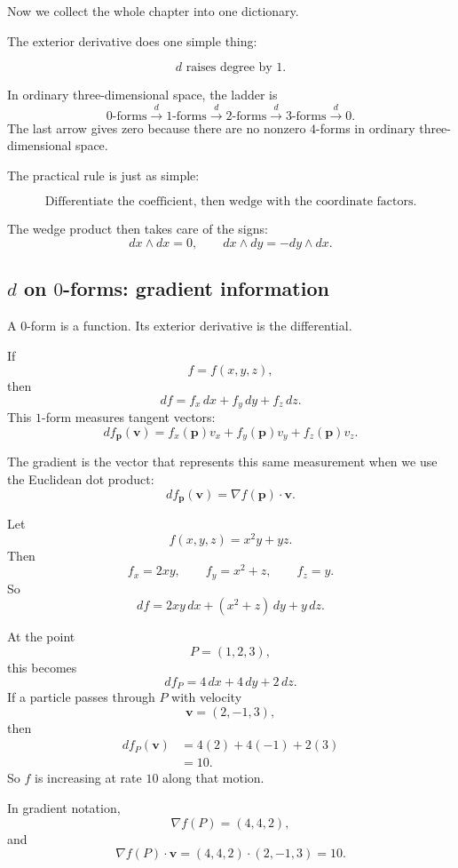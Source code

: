 Now we collect the whole chapter into one dictionary.

The exterior derivative does one simple thing:

\[
\boxed{
    d \text{ raises degree by }1.
}
\]

In ordinary three-dimensional space, the ladder is
\[
    0\text{-forms}
    \xrightarrow{\ d\ }
    1\text{-forms}
    \xrightarrow{\ d\ }
    2\text{-forms}
    \xrightarrow{\ d\ }
    3\text{-forms}
    \xrightarrow{\ d\ }
    0.
\]
The last arrow gives zero because there are no nonzero \(4\)-forms in ordinary
three-dimensional space.

The practical rule is just as simple:

\[
\boxed{
    \text{Differentiate the coefficient, then wedge with the coordinate factors.}
}
\]

The wedge product then takes care of the signs:
\[
    dx\wedge dx=0,
    \qquad
    dx\wedge dy=-dy\wedge dx.
\]

\subsection{\texorpdfstring{\(d\)}{d} on \texorpdfstring{\(0\)}{0}-forms:
gradient information}

A \(0\)-form is a function.  Its exterior derivative is the differential.

If
\[
    f=f(x,y,z),
\]
then
\[
\boxed{
    df=f_x\,dx+f_y\,dy+f_z\,dz.
}
\]
This \(1\)-form measures tangent vectors:
\[
    df_{\mathbf p}(\mathbf v)
    =
    f_x(\mathbf p)v_x+f_y(\mathbf p)v_y+f_z(\mathbf p)v_z.
\]

The gradient is the vector that represents this same measurement when we use the
Euclidean dot product:
\[
\boxed{
    df_{\mathbf p}(\mathbf v)
    =
    \nabla f(\mathbf p)\cdot \mathbf v.
}
\]

\begin{example}
Let
\[
    f(x,y,z)=x^2y+yz.
\]
Then
\[
    f_x=2xy,
    \qquad
    f_y=x^2+z,
    \qquad
    f_z=y.
\]
So
\[
\boxed{
    df=2xy\,dx+(x^2+z)\,dy+y\,dz.
}
\]

At the point
\[
    P=(1,2,3),
\]
this becomes
\[
    df_P=4\,dx+4\,dy+2\,dz.
\]
If a particle passes through \(P\) with velocity
\[
    \mathbf v=(2,-1,3),
\]
then
\[
\begin{aligned}
    df_P(\mathbf v)
    &=
    4(2)+4(-1)+2(3)\\
    &=
    10.
\end{aligned}
\]
So \(f\) is increasing at rate \(10\) along that motion.

In gradient notation,
\[
    \nabla f(P)=(4,4,2),
\]
and
\[
    \nabla f(P)\cdot \mathbf v
    =
    (4,4,2)\cdot(2,-1,3)
    =
    10.
\]
\end{example}

